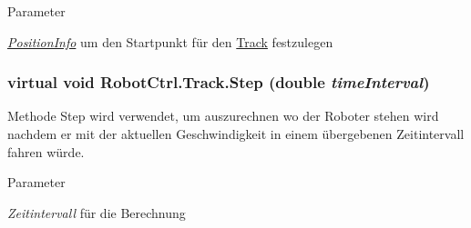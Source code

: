 \begin{DoxyParams}{Parameter}
\item[{\em \hyperlink{struct_robot_ctrl_1_1_position_info}{PositionInfo}}]um den Startpunkt für den \hyperlink{class_robot_ctrl_1_1_track}{Track} festzulegen \end{DoxyParams}
\hypertarget{class_robot_ctrl_1_1_track_a82386b9a49faa6a31d9706f39238f21b}{
\subsubsection[{Step}]{\setlength{\rightskip}{0pt plus 5cm}virtual void RobotCtrl.Track.Step (double {\em timeInterval})}}
\label{class_robot_ctrl_1_1_track_a82386b9a49faa6a31d9706f39238f21b}
Methode Step wird verwendet, um auszurechnen wo der Roboter stehen wird nachdem er mit der aktuellen Geschwindigkeit in einem \"{u}bergebenen Zeitintervall fahren würde.


\begin{DoxyParams}{Parameter}
\item[{\em Zeitintervall}]f\"{u}r die Berechnung \end{DoxyParams}


